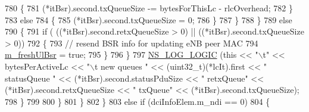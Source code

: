 \begin{DoxyCode}
780                                                                         \{
781                                                                                 (*itBsr).second.txQueueSize
       -= bytesForThisLc - rlcOverhead;
782                                                                         \}
783                                                                         \textcolor{keywordflow}{else}
784                                                                         \{
785                                                                                 (*itBsr).second.txQueueSize
       = 0;
786                                                                         \}
787                                                                 \}
788                                                         \}
789                                                         \textcolor{keywordflow}{else}
790                                                         \{
791                                                                 \textcolor{keywordflow}{if} ( ((*itBsr).second.retxQueueSize > 0) ||
       ((*itBsr).second.txQueueSize > 0))
792                                                                 \{
793                                                                         \textcolor{comment}{// resend BSR info for updating eNB
       peer MAC}
794                                                                         
      \hyperlink{classns3_1_1MmWaveUeMac_a79635011889d0b8dff64f05a2a691218}{m\_freshUlBsr} = \textcolor{keyword}{true};
795                                                                 \}
796                                                         \}
797                                                         \hyperlink{group__logging_ga88acd260151caf2db9c0fc84997f45ce}{NS\_LOG\_LOGIC} (\textcolor{keyword}{this} << \textcolor{stringliteral}{"\(\backslash\)t"} << 
      bytesPerActiveLc << \textcolor{stringliteral}{"\(\backslash\)t new queues "} << (uint32\_t)(*lcIt).first << \textcolor{stringliteral}{" statusQueue "} << (*itBsr).second.statusPduSize 
      << \textcolor{stringliteral}{" retxQueue"} << (*itBsr).second.retxQueueSize << \textcolor{stringliteral}{" txQueue"} <<  (*itBsr).second.txQueueSize);
798                                                 \}
799 
800                                         \}
801                                 \}
802                         \}
803                         \textcolor{keywordflow}{else} \textcolor{keywordflow}{if} (dciInfoElem.m\_ndi == 0)
804                         \{

\end{DoxyCode}
